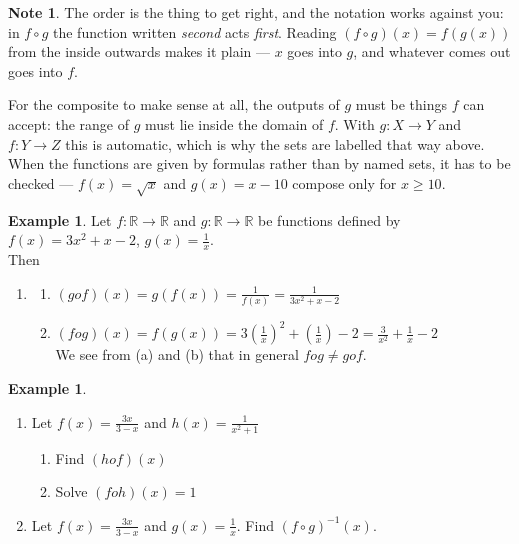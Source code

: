 \documentclass[11pt,a4paper]{article}
\theoremstyle{definition}
\newtheorem{example}[thm]{Example}
\newtheorem{note}[thm]{Note}
\begin{document}
\begin{note}
The order is the thing to get right, and the notation works against you: in
$f\circ g$ the function written \emph{second} acts \emph{first}. Reading
$(f\circ g)(x)=f(g(x))$ from the inside outwards makes it plain --- $x$ goes into
$g$, and whatever comes out goes into $f$.

For the composite to make sense at all, the outputs of $g$ must be things $f$ can
accept: the range of $g$ must lie inside the domain of $f$. With
$g:X\to Y$ and $f:Y\to Z$ this is automatic, which is why the sets are labelled
that way above. When the functions are given by formulas rather than by named
sets, it has to be checked --- $f(x)=\sqrt{x}$ and $g(x)=x-10$ compose only for
$x\geq 10$.
\end{note}
\begin{example}

Let $f:\mathbb{R}\longrightarrow \mathbb{R}$ and $g:\mathbb{R}\longrightarrow \mathbb{R}$ be functions defined by $f(x)=3x^2+x-2$, $g(x)=\frac{1}{x}$.\\

Then
\begin{enumerate}
\item[]
\begin{enumerate}
      \item $(gof)(x)=g(f(x))=\frac{1}{f(x)}=\frac{1}{3x^2+x-2}$\\
      \item $(fog)(x)=f(g(x))=3\left(\frac{1}{x}\right)^2+\left(\frac{1}{x}\right)-2=\frac{3}{x^2}+\frac{1}{x}-2$\\
      
      We see from (a) and (b) that in general $fog\neq gof$.\\
\end{enumerate}
\end{enumerate}
\end{example}
\begin{example}

\begin{enumerate}
\item Let $f(x)=\frac{3x}{3-x}$ and $h(x)=\frac{1}{x^2+1}$
\begin{enumerate}
      \item Find $(hof)(x)$
      \item Solve $(foh)(x)=1$
\end{enumerate}

\item Let $f(x)=\frac{3x}{3-x}$ and $g(x)=\frac{1}{x}$. Find $(f\circ g)^{-1}(x)$.
\end{enumerate}
\end{example}
\end{document}
